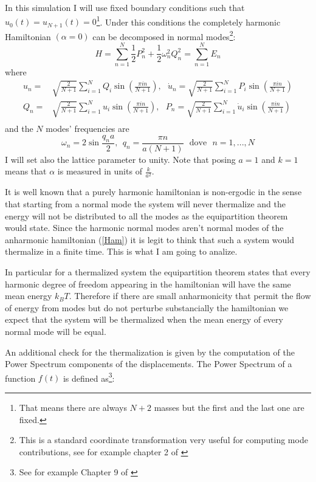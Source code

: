 \documentclass[10pt]{article}
\numberwithin{equation}{section}
\begin{document}
In this simulation I will use fixed boundary conditions such that $u_0 (t) = u_{N+1} (t) = 0$\footnote{That means there are always $N+2$ masses but the first and the last one are fixed.}.
Under this conditions the completely harmonic Hamiltonian $(\alpha=0)$ can be decomposed in normal modes\footnote{This is a standard coordinate transformation very useful for computing mode contributions, see for example chapter 2 of \cite{FPU} }:
\begin{equation}
H = \sum_{n=1}^N \frac{1}{2} P_n^2 + \frac{1}{2} \omega_n^2 Q_n^2 = \sum_{n=1}^N E_n
\end{equation}
where 
\begin{align} 
u_n =& \sqrt{\frac{2}{N+1}} \sum_{i=1}^N Q_i \sin(\frac{\pi i n}{N+1})  , \ \ \ \dot{u}_n =\sqrt{\frac{2}{N+1}} \sum_{i=1}^N P_i \sin(\frac{\pi i n}{N+1}) \label{UnU} \\
Q_n =& \sqrt{\frac{2}{N+1}} \sum_{i=1}^N u_i \sin(\frac{\pi i n}{N+1}) , \ \ \ P_n =\sqrt{\frac{2}{N+1}} \sum_{i=1}^N \dot{u}_i \sin(\frac{\pi i n}{N+1}) \label{QnP} \\
\end{align}
and the $N$ modes' frequencies are
\begin{equation}
\omega_n = 2 \sin \frac{ q_n a}{2} , \ \ q_n = \frac{\pi n}{a(N+1)} \ \ \ \text{dove} \ \ \ n=1,...,N
\end{equation}
I will set also the lattice parameter to unity. Note that posing $a=1$ and $k=1$ means that $\alpha$ is measured in units of $\frac{k}{a^2}$.

It is well known that a purely harmonic hamiltonian is non-ergodic in the sense that starting from a normal mode the system will never thermalize and the energy will not be distributed to all the modes as the equipartition theorem would state.
Since the harmonic normal modes aren't normal modes of the anharmonic hamiltonian (\ref{Ham}) it is legit to think that such a system would thermalize in a finite time. This is what I am going to analize. 

In particular for a thermalized system the equipartition theorem states that every harmonic degree of freedom appearing in the hamiltonian will have the same mean energy $k_B T$. Therefore if there are small anharmonicity that permit the flow of energy from modes but do not perturbe substancially the hamiltonian we expect that the system will be thermalized when the mean energy of every normal mode will be equal.

An additional check for the thermalization is given by the computation of the Power Spectrum components of the displacements. The Power Spectrum of a function $f(t)$ is defined as\footnote{See for example Chapter 9 of \citep{GTC}}:
\end{document}
